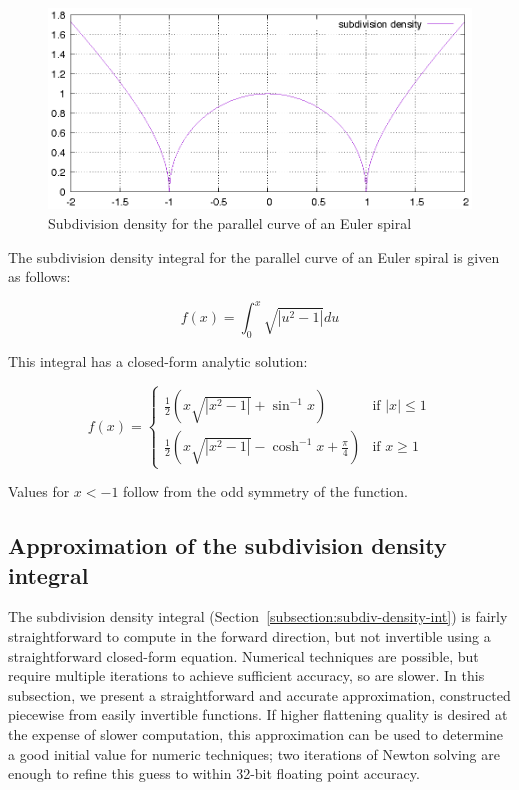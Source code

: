 \documentclass[sigconf, nonacm]{acmart}
\begin{document}
\begin{figure}
    \includegraphics[scale=0.6]{subdiv_density}
    \caption{Subdivision density for the parallel curve of an Euler spiral}
    \label{fig:subdiv_density}
\end{figure}

The subdivision density integral for the parallel curve of an Euler spiral is given as follows:

\[
    f(x) = \int_0^x\sqrt{|u^2 - 1|} du
\]

This integral has a closed-form analytic solution:

\[
    f(x) = \left\{
        \begin{array}{rl}
            \frac{1}{2}(x\sqrt{|x^2-1|} + \sin^{-1}x) & \text{if } |x| \leq 1 \\
            \frac{1}{2}(x\sqrt{|x^2-1|} - \cosh^{-1}x + \frac{\pi}{4}) & \text{if } x \geq 1
        \end{array}
    \right.
\]

Values for $x<-1$ follow from the odd symmetry of the function. 


\subsection{Approximation of the subdivision density integral}

The subdivision density integral (Section~\ref{subsection:subdiv-density-int}) is fairly straightforward to compute in the forward direction, but not invertible using a straightforward closed-form equation. Numerical techniques are possible, but require multiple iterations to achieve sufficient accuracy, so are slower. In this subsection, we present a straightforward and accurate approximation, constructed piecewise from easily invertible functions. If higher flattening quality is desired at the expense of slower computation, this approximation can be used to determine a good initial value for numeric techniques; two iterations of Newton solving are enough to refine this guess to within 32-bit floating point accuracy.
\end{document}
